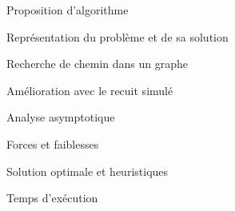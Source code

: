 \begin{frame}{Proposition d'algorithme}
\end{frame}

\begin{frame}{Représentation du problème et de sa solution}  
\end{frame}

\begin{frame}{Recherche de chemin dans un graphe}  
\end{frame}

\begin{frame}{Amélioration avec le recuit simulé}  
\end{frame}

\begin{frame}{Analyse asymptotique}
\end{frame}

\begin{frame}{Forces et faiblesses}
\end{frame}

\begin{frame}{Solution optimale et heuristiques}
\end{frame}

\begin{frame}{Temps d'exécution}
\end{frame}
